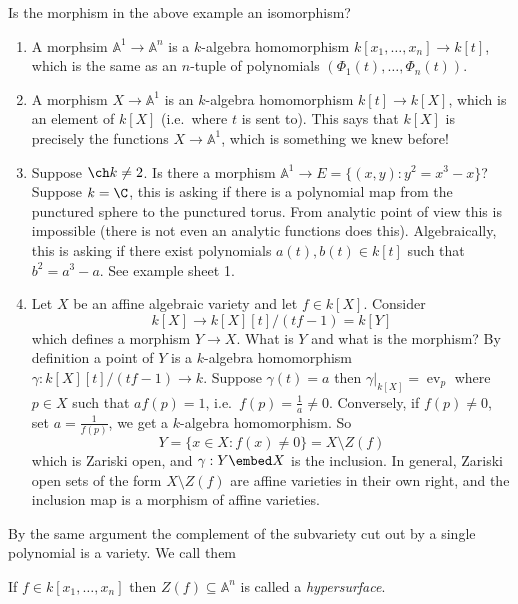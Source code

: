 \documentclass[a4paper]{article}
\renewcommand{\A}{\mathbb{A}}
\DeclareMathOperator{\ev}{ev}
\begin{document}
\begin{question}
  Is the morphism in the above example an isomorphism?
\end{question}

\begin{eg}\leavevmode
  \begin{enumerate}
  \item A morphsim \(\A^1 \to \A^n\) is a \(k\)-algebra homomorphism \(k[x_1, \dots, x_n] \to k[t]\), which is the same as an \(n\)-tuple of polynomials \((\Phi_1(t), \dots, \Phi_n(t))\).
  \item A morphism \(X \to \A^1\) is an \(k\)-algebra homomorphism \(k[t] \to k[X]\), which is an element of \(k[X]\) (i.e.\ where \(t\) is sent to). This says that \(k[X]\) is precisely the functions \(X \to \A^1\), which is something we knew before!
  \item Suppose \(\ch k \neq 2\). Is there a morphism \(\A^1 \to E = \{(x, y): y^2 = x^3 - x\}\)? Suppose \(k = \C\), this is asking if there is a polynomial map from the punctured sphere to the punctured torus. From analytic point of view this is impossible (there is not even an analytic functions does this). Algebraically, this is asking if there exist polynomials \(a(t), b(t) \in k[t]\) such that \(b^2 = a^3 - a\). See example sheet 1.
  \item Let \(X\) be an affine algebraic variety and let \(f \in k[X]\). Consider
    \[
      k[X] \to k[X][t]/(tf - 1) = k[Y]
    \]
    which defines a morphism \(Y \to X\). What is \(Y\) and what is the morphism? By definition a point of \(Y\) is a \(k\)-algebra homomorphism \(\gamma: k[X][t]/(tf - 1) \to k\). Suppose \(\gamma(t) = a\) then \(\gamma|_{k[X]} = \ev_p\) where \(p \in X\) such that \(a f(p) = 1\), i.e.\ \(f(p) = \frac{1}{a} \neq 0\). Conversely, if \(f(p) \neq 0\), set \(a = \frac{1}{f(p)}\), we get a \(k\)-algebra homomorphism. So
    \[
      Y = \{x \in X: f(x) \neq 0\} = X \setminus Z(f)
    \]
    which is Zariski open, and \(\gamma: Y \embed X\) is the inclusion. In general, Zariski open sets of the form \(X \setminus Z(f)\) are affine varieties in their own right, and the inclusion map is a morphism of affine varieties.
  \end{enumerate}
\end{eg}

By the same argument the complement of the subvariety cut out by a single polynomial is a variety. We call them

\begin{definition}[hypersurface]
  If \(f \in k[x_1, \dots, x_n]\) then \(Z(f) \subseteq \A^n\) is called a \emph{hypersurface}.
\end{definition}
\end{document}
